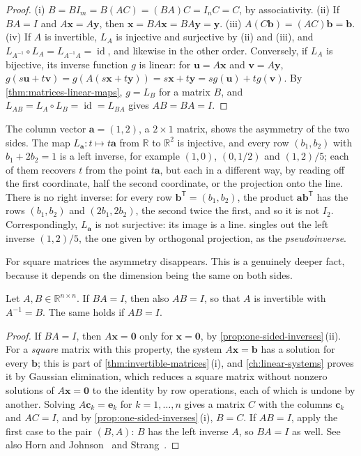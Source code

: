 \begin{proof}
(i) $B=BI_m=B(AC)=(BA)C=I_nC=C$, by associativity. (ii) If $BA=I$ and $A\mathbf x=A\mathbf y$, then $\mathbf x=BA\mathbf x=BA\mathbf y=\mathbf y$. (iii) $A(C\mathbf b)=(AC)\mathbf b=\mathbf b$. (iv) If $A$ is invertible, $L_A$ is injective and surjective by (ii) and (iii), and $L_{A^{-1}}\circ L_A=L_{A^{-1}A}=\operatorname{id}$, and likewise in the other order. Conversely, if $L_A$ is bijective, its inverse function $g$ is linear: for $\mathbf u=A\mathbf x$ and $\mathbf v=A\mathbf y$, $g(s\mathbf u+t\mathbf v)=g(A(s\mathbf x+t\mathbf y))=s\mathbf x+t\mathbf y=sg(\mathbf u)+tg(\mathbf v)$. By \cref{thm:matrices-linear-maps}, $g=L_B$ for a matrix $B$, and $L_{AB}=L_A\circ L_B=\operatorname{id}=L_{BA}$ gives $AB=BA=I$.
\end{proof}

The column vector $\mathbf a=(1,2)$, a $2\times1$ matrix, shows the asymmetry of the two sides. The map $L_{\mathbf a}\colon t\mapsto t\mathbf a$ from $\mathbb R$ to $\mathbb R^2$ is injective, and every row $(b_1,b_2)$ with $b_1+2b_2=1$ is a left inverse, for example $(1,0)$, $(0,1/2)$ and $(1,2)/5$; each of them recovers $t$ from the point $t\mathbf a$, but each in a different way, by reading off the first coordinate, half the second coordinate, or the projection onto the line. There is no right inverse: for every row $\mathbf b^{\mathsf T}=(b_1,b_2)$, the product $\mathbf a\mathbf b^{\mathsf T}$ has the rows $(b_1,b_2)$ and $(2b_1,2b_2)$, the second twice the first, and so it is not $I_2$. Correspondingly, $L_{\mathbf a}$ is not surjective: its image is a line.  singles out the left inverse $(1,2)/5$, the one given by orthogonal projection, as the \emph{pseudoinverse}.

For square matrices the asymmetry disappears. This is a genuinely deeper fact, because it depends on the dimension being the same on both sides.

\begin{theorem}
\label{thm:one-sided-square}
Let $A,B\in\mathbb R^{n\times n}$. If $BA=I$, then also $AB=I$, so that $A$ is invertible with $A^{-1}=B$. The same holds if $AB=I$.
\end{theorem}

\begin{proof}
If $BA=I$, then $A\mathbf x=\mathbf 0$ only for $\mathbf x=\mathbf 0$, by \cref{prop:one-sided-inverses}\,(ii). For a \emph{square} matrix with this property, the system $A\mathbf x=\mathbf b$ has a solution for every $\mathbf b$; this is part of \cref{thm:invertible-matrices}\,(i), and \cref{ch:linear-systems} proves it by Gaussian elimination, which reduces a square matrix without nonzero solutions of $A\mathbf x=\mathbf 0$ to the identity by row operations, each of which is undone by another. Solving $A\mathbf c_k=\mathbf e_k$ for $k=1,\ldots,n$ gives a matrix $C$ with the columns $\mathbf c_k$ and $AC=I$, and by \cref{prop:one-sided-inverses}\,(i), $B=C$. If $AB=I$, apply the first case to the pair $(B,A)$: $B$ has the left inverse $A$, so $BA=I$ as well. See also Horn and Johnson~\cite[Sect.~0.5]{horn2013} and Strang~\cite[Sect.~2.5]{strang2016}.
\end{proof}

